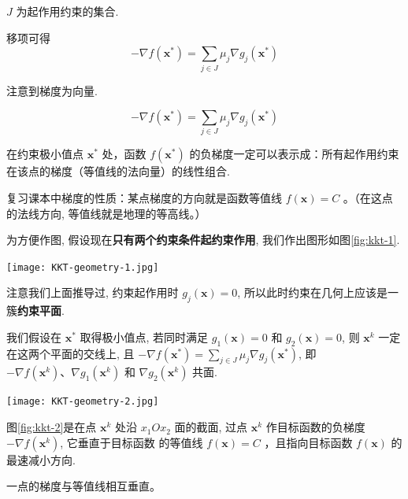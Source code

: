 $J$ 为起作用约束的集合.

移项可得 $$ -\nabla f\left(\mathbf{x}^{*}\right)=\sum_{j \in J} \mu_{j} \nabla g_{j}\left(\mathbf{x}^{*}\right) $$

注意到梯度为向量. 

\begin{theorem}
    $$ -\nabla f\left(\mathbf{x}^{*}\right)=\sum_{j \in J} \mu_{j} \nabla g_{j}\left(\mathbf{x}^{*}\right) $$

    在约束极小值点 $ \mathbf{x}^{*} $ 处，函数 $ f\left(\mathbf{x}^{*}\right) $ 的负梯度一定可以表示成：所有起作用约束在该点的梯度（等值线的法向量）的线性组合.
\end{theorem}


\begin{corollary}[梯度的性质]
    复习课本中梯度的性质：某点梯度的方向就是函数等值线 $ f(\mathbf{x})=C $ 。（在这点的法线方向, 等值线就是地理的等高线。）
\end{corollary}

为方便作图, 假设现在\textbf{只有两个约束条件起约束作用}, 我们作出图形如图\ref{fig:kkt-1}.

\begin{FigureCenter}{}
    \label{fig:kkt-1}
    \texttt{[image: KKT-geometry-1.jpg]}
\end{FigureCenter}


注意我们上面推导过, 约束起作用时 $ g_{j}(\mathbf{x})=0 $, 所以此时约束在几何上应该是一簇\textbf{约束平面}.

我们假设在 $ \mathbf{x}^{*} $ 取得极小值点, 若同时满足 $ g_{1}(\mathbf{x})=0 $ 和 $ g_{2}(\mathbf{x})=0 $, 则 $ \mathbf{x}^{k} $ 一定在这两个平面的交线上, 且 $ -\nabla f\left(\mathbf{x}^{*}\right)=\sum_{j \in J} \mu_{j} \nabla g_{j}\left(\mathbf{x}^{*}\right) $, 即 $ -\nabla f\left(\mathbf{x}^{k}\right) 、 \nabla g_{1}\left(\mathbf{x}^{k}\right) $ 和 $ \nabla g_{2}\left(\mathbf{x}^{k}\right) $ 共面.

\begin{FigureCenter}{}
    \label{fig:kkt-2}
    \texttt{[image: KKT-geometry-2.jpg]}
\end{FigureCenter}

图\ref{fig:kkt-2}是在点 $ \mathbf{x}^{k} $ 处沿 $ x_{1} O x_{2} $ 面的截面, 过点 $ \mathbf{x}^{k} $ 作目标函数的负梯度 $ -\nabla f\left(\mathbf{x}^{k}\right) $, 它垂直于目标函数 的等值线 $ f(\mathbf{x})=C $ ，且指向目标函数 $ f(\mathbf{x}) $ 的最速减小方向.

\begin{corollary}
    一点的梯度与等值线相互垂直。
\end{corollary}

